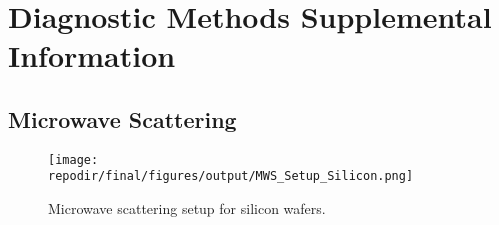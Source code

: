 \section{Diagnostic Methods Supplemental Information}

\subsection{Microwave Scattering}

\begin{figure}[]
\centering
\texttt{[image: \\repodir/final/figures/output/MWS\_Setup\_Silicon.png]}
\caption{Microwave scattering setup for silicon wafers.}
\label{fig:SI_MWS_Setup_Silicon}
\end{figure}

